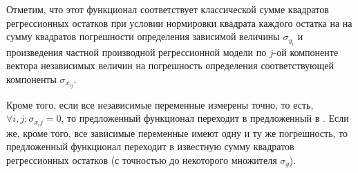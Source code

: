 \documentclass[11pt,a4paper]{article}
\begin{document}
Отметим, что этот функционал соответствует классической сумме квадратов регрессионных
остатков при условии нормировки квадрата каждого остатка на на сумму квадратов погрешности
определения зависимой величины $\sigma_{y_i}$ и произведения частной производной
регрессионной модели по $j$-ой компоненте вектора независимых величин на погрешность
определения соответствующей компоненты $\sigma_{x_{ij}}$.

Кроме того, если все независимые переменные измерены точно, то есть,
$\forall i, j : \sigma_{x_ij} = 0$, то предложенный функционал переходит в предложенный
в \cite{...}. Если же, кроме того, все зависимые переменные имеют одну и ту же погрешность,
то предложенный функционал переходит в известную сумму квадратов регрессионных остатков
(с точностью до некоторого множителя $\sigma_y$).


\FloatBarrier


%
%

\end{document}
